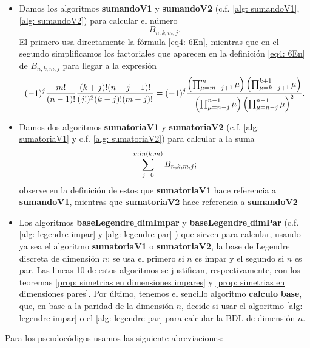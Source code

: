 \begin{itemize}
\item Damos los algoritmos \textbf{sumandoV1} y 
\textbf{sumandoV2} (c.f. \ref{alg: sumandoV1},
\ref{alg: sumandoV2}) para calcular el número
\begin{equation}
\label{eq0: 1Abril}
B_{n, k, m, j}.
\end{equation}
El primero usa directamente la fórmula \eqref{eq4: 6En},
mientras que en el segundo 
simplificamos los factoriales que
aparecen en la definición \eqref{eq4: 6En}
de $B_{n,k,m,j}$
para llegar a la expresión
\[
(-1)^{j}
\frac{m!}{(n-1)!}
 \frac{(k+j)!(n-j-1)!}{(j!)^{2}(k-j)!(m-j)!}
= (-1)^{j}
\frac{\left( \prod_{\mu=m-j+1}^{m}{\mu} \right)
\left( \prod_{\mu=k-j+1}^{k+1}{\mu} \right)
}{
\left( \prod_{\mu=n-j}^{n-1}{\mu} \right)
\left( \prod_{\mu=n-j}^{n-1}{\mu} \right)^{2}
}.
\] 

\item Damos dos algoritmos \textbf{sumatoriaV1}
y \textbf{sumatoriaV2} (c.f. \ref{alg: sumatoriaV1}
y c.f. \ref{alg: sumatoriaV2}) para calcular a la suma
\begin{equation}
\label{eq1: 1Abril}
\sum\limits_{j=0}^{min(k,m)}B_{n, k, m, j};
\end{equation}
observe en la definición de estos que 
\textbf{sumatoriaV1} hace referencia a
\textbf{sumandoV1}, mientras que \textbf{sumatoriaV2}
hace referencia a \textbf{sumandoV2}


\item Los algoritmos 
\textbf{baseLegendre$\_$dimImpar} y
\textbf{baseLegendre$\_$dimPar} 
(c.f. \ref{alg: legendre impar} y \ref{alg: legendre par} )
que sirven para calcular, usando ya sea el algoritmo
\textbf{sumatoriaV1} o \textbf{sumatoriaV2},
la base de Legendre discreta de dimensión $n$; se usa el primero
si $n$ es impar y el segundo si $n$ es par.
Las lineas 10 de estos 
algoritmos se justifican,
respectivamente, con los teoremas 
\ref{prop: simetrias en dimensiones impares}
y \ref{prop: simetrias en dimensiones pares}.
Por último, tenemos el sencillo algoritmo \textbf{calculo$\_$base},
que, en base a la paridad de la dimensión $n$, decide si usar
el algoritmo \ref{alg: legendre impar} o el \ref{alg: legendre par}
para calcular la BDL de dimensión $n$.
\end{itemize}

Para los pseudocódigos usamos las siguiente abreviaciones:

